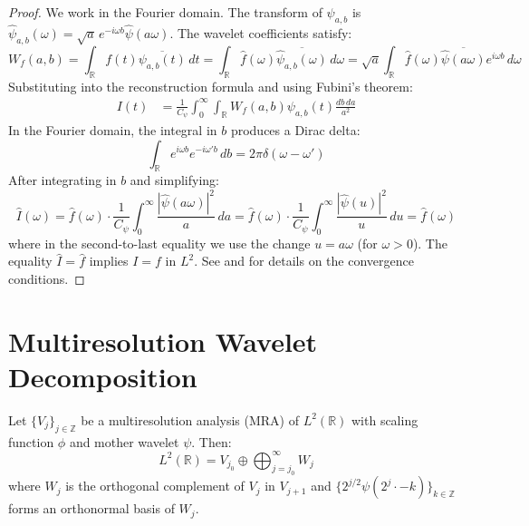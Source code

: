 \begin{proof}
We work in the Fourier domain. The transform of $\psi_{a,b}$ is $\hat{\psi}_{a,b}(\omega) = \sqrt{a} \, e^{-i\omega b} \hat{\psi}(a\omega)$. The wavelet coefficients satisfy:
\[
W_f(a,b) = \int_{\mathbb{R}} f(t) \overline{\psi_{a,b}(t)} \, dt = \int_{\mathbb{R}} \hat{f}(\omega) \overline{\hat{\psi}_{a,b}(\omega)} \, d\omega = \sqrt{a} \int_{\mathbb{R}} \hat{f}(\omega) \overline{\hat{\psi}(a\omega)} e^{i\omega b} \, d\omega
\]
Substituting into the reconstruction formula and using Fubini's theorem:
\begin{align}
I(t) &= \frac{1}{C_\psi} \int_0^\infty \int_{\mathbb{R}} W_f(a,b) \psi_{a,b}(t) \frac{db \, da}{a^2}
\end{align}
In the Fourier domain, the integral in $b$ produces a Dirac delta:
\[
\int_{\mathbb{R}} e^{i\omega b} e^{-i\omega' b} \, db = 2\pi \delta(\omega - \omega')
\]
After integrating in $b$ and simplifying:
\[
\hat{I}(\omega) = \hat{f}(\omega) \cdot \frac{1}{C_\psi} \int_0^\infty \frac{|\hat{\psi}(a\omega)|^2}{a} \, da = \hat{f}(\omega) \cdot \frac{1}{C_\psi} \int_0^\infty \frac{|\hat{\psi}(u)|^2}{u} \, du = \hat{f}(\omega)
\]
where in the second-to-last equality we use the change $u = a\omega$ (for $\omega > 0$). The equality $\hat{I} = \hat{f}$ implies $I = f$ in $L^2$. See \citep[Theorem~4.3]{Mallat2009} and \citep[Chapter~2]{Daubechies1992} for details on the convergence conditions.
\end{proof}

\section{Multiresolution Wavelet Decomposition}\label{sec:descomposicion_wavelet}

\begin{theorem}\label{thm:descomposicion_wavelet_apendice}
Let $\{V_j\}_{j \in \mathbb{Z}}$ be a multiresolution analysis (MRA) of $L^2(\mathbb{R})$ with scaling function $\phi$ and mother wavelet $\psi$. Then:
\[
L^2(\mathbb{R}) = V_{j_0} \oplus \bigoplus_{j=j_0}^{\infty} W_j
\]
where $W_j$ is the orthogonal complement of $V_j$ in $V_{j+1}$ and $\{2^{j/2}\psi(2^j \cdot - k)\}_{k \in \mathbb{Z}}$ forms an orthonormal basis of $W_j$.
\end{theorem}

